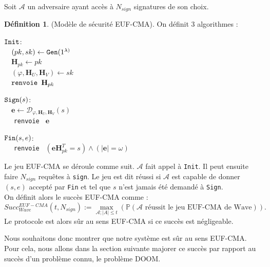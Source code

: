 \documentclass[12pt]{article}
\theoremstyle{definition}
\newtheorem{defi}[thm]{Définition}
\begin{document}
Soit $\mathcal{A}$ un adversaire ayant accès à $N_{sign}$ signatures de son choix.
\begin{defi} (Modèle de sécurité EUF-CMA). On définit 3 algorithmes :
\begin{multicols}{2}
\begin{flushleft}
$\verb|Init|$:\\
	$\quad (pk,sk) \leftarrow \verb|Gen|(1^{\lambda)}$ \\
	$\quad \mathbf{H}_{pk} \leftarrow pk$ \\
	$\quad (\varphi, \mathbf{H}_{U},\mathbf{H}_{V}) \leftarrow sk$ \\
	$\quad \verb|renvoie | \mathbf{H}_{pk}$ \\
\end{flushleft}
\begin{flushleft}
$\verb|Sign|(s)$: \\
	$\quad \mathbf{e} \leftarrow \mathcal{D}_{\varphi,\mathbf{H}_{U},\mathbf{H}_{V}}(s)$ \\
	$\quad$ \verb|renvoie | $\mathbf{e}$
\end{flushleft}
\begin{flushleft}
$\verb|Fin|(s,e)$: \\
	$\quad$ \verb|renvoie | $(\mathbf{e}\mathbf{H}_{pk}^T = s) \land (|\mathbf{e}| = \omega)$
\end{flushleft}
\end{multicols}
Le jeu EUF-CMA se déroule comme suit. $\mathcal{A}$ fait appel à \verb|Init|. Il peut ensuite faire $N_{sign}$ requêtes à \verb|sign|. Le jeu est dit réussi si $\mathcal{A}$ est capable de donner $(s,e)$ accepté par \verb|Fin| et tel que $s$ n'est jamais été demandé à \verb|Sign|. \\
On définit alors le succès EUF-CMA comme :
$$Succ^{EUF-CMA}_{Wave}(t,N_{sign}) := \max_{\mathcal{A};|A|\leq t}(\mathbb{P}(\mathcal{A}\text{ réussit le jeu EUF-CMA de Wave})).$$
Le protocole est alors sûr au sens EUF-CMA si ce succès est négligeable.
\end{defi}

Nous souhaitons donc montrer que notre système est sûr au sens EUF-CMA. Pour cela, nous allons dans la section suivante majorer ce succès par rapport au succès d'un problème connu, le problème DOOM.
\end{document}
